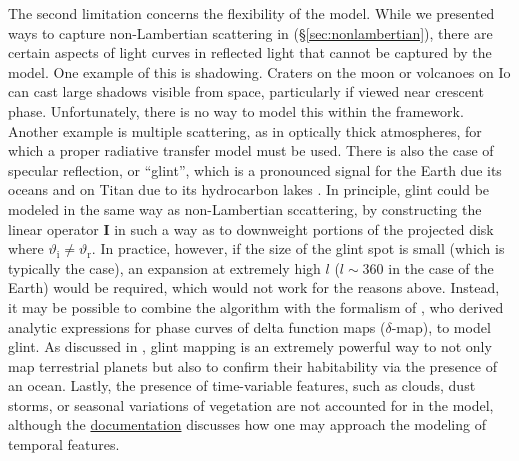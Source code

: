 \documentclass[modern]{aastex62}
\begin{document}
The second limitation concerns the flexibility of the \starry model.
While we presented ways to capture non-Lambertian scattering
in \starry (\S\ref{sec:nonlambertian}), there are certain aspects
of light curves in reflected light that cannot be captured by the model.
One example of this is shadowing. Craters on the moon or
volcanoes on Io can cast large shadows visible from space, particularly
if viewed near crescent phase. Unfortunately, there is no way to model
this within the \starry framework. Another example is multiple scattering,
as in optically thick atmospheres, for which a proper radiative transfer model
must be used. There is also the case of specular reflection,
or ``glint'', which is a pronounced signal for the Earth due its
oceans \citep{Robinson2014} and on Titan due to
its hydrocarbon lakes \citep{Barnes2011}. In principle, glint could be
modeled in the same way as non-Lambertian sccattering, by constructing the
linear operator $\mathbf{I}$ in such a way as to downweight portions of the
projected disk where $\vartheta_\mathrm{i} \neq \vartheta_\mathrm{r}$. In practice, however,
if the size of the glint spot is small (which is typically the case),
an expansion at extremely high $l$ ($l \sim 360$ in the case of the Earth)
would be required, which would not work for the reasons above.
Instead, it may be possible to combine the \starry algorithm with the
formalism of \citet{Haggard2018}, who derived analytic expressions for
phase curves of delta function maps ($\delta$-map), to model glint.
As discussed in \citet{LustigYaeger2018}, glint mapping is an extremely
powerful way to not only map terrestrial planets but also to confirm
their habitability via the presence of an ocean.  Lastly, the presence
of time-variable features, such as clouds, dust storms, or seasonal
variations of vegetation are not accounted for in the model, although
the \href{https://starry.readthedocs.io}{documentation} discusses
how one may approach the modeling of temporal features.
\end{document}
